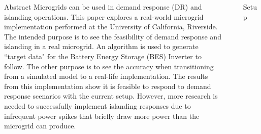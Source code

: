 \documentclass[final, 20 pt]{beamer}
\newlength{\sepwid}
\newlength{\onecolwid}
\newlength{\twocolwid}
\begin{document}
\begin{frame}[t]
\begin{columns}[t]
\begin{column}{\onecolwid}
\begin{block}{Abstract}
	Microgrids can be used in demand response (DR) and islanding operations. This paper explores a real-world microgrid implementation performed at the University of California, Riverside. The intended purpose is to see the feasibility of demand response and islanding in a real microgrid. An algorithm is used to generate ``target data" for the Battery Energy Storage (BES) Inverter to follow. The other purpose is to see the accuracy when transitioning from a simulated model to a real-life implementation. The results from this implementation show it is feasible to respond to demand response scenarios with the current setup. However, more research is needed to successfully implement islanding responses due to infrequent power spikes that briefly draw more power than the microgrid can produce.

\end{block}




\end{column} %

\begin{column}{\sepwid}\end{column} %

\begin{column}{\twocolwid} %

\begin{columns}[t,totalwidth=\twocolwid] %

\begin{column}{\onecolwid}\vspace{-.6in} %


\begin{block}{Setup}
	\begin{figure}[!htb] 		
		\texttt{[image: Fig/power\_system\_setup.pdf]}
		\caption{Power System Setup for Office Building Microgrid}
		\label{pow}			
	\end{figure}
\end{block}


\end{column}
\end{columns}
\end{column}
\end{columns}
\end{frame}
\end{document}
